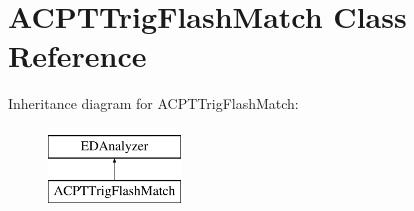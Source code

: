 \hypertarget{classACPTTrigFlashMatch}{\section{A\-C\-P\-T\-Trig\-Flash\-Match Class Reference}
\label{classACPTTrigFlashMatch}
}
Inheritance diagram for A\-C\-P\-T\-Trig\-Flash\-Match\-:\begin{figure}[H]
\begin{center}
\leavevmode
\includegraphics[height=2.000000cm]{classACPTTrigFlashMatch}
\end{center}
\end{figure}
